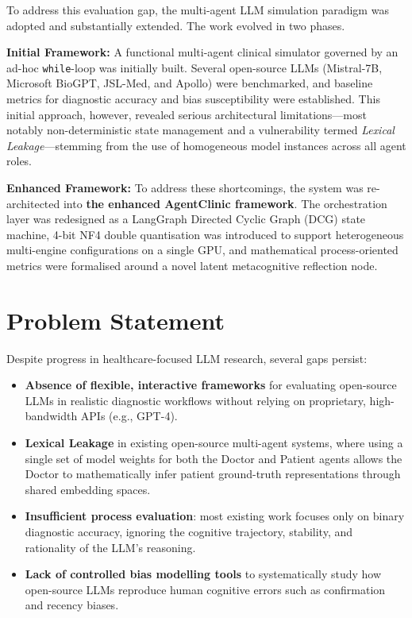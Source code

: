 To address this evaluation gap, the multi-agent LLM simulation paradigm was adopted and substantially extended. The work evolved in two phases.

\textbf{Initial Framework:} A functional multi-agent clinical simulator governed by an ad-hoc \texttt{while}-loop was initially built. Several open-source LLMs (Mistral-7B, Microsoft BioGPT, JSL-Med, and Apollo) were benchmarked, and baseline metrics for diagnostic accuracy and bias susceptibility were established. This initial approach, however, revealed serious architectural limitations---most notably non-deterministic state management and a vulnerability termed \textit{Lexical Leakage}---stemming from the use of homogeneous model instances across all agent roles.

\textbf{Enhanced Framework:} To address these shortcomings, the system was re-architected into \textbf{the enhanced AgentClinic framework}. The orchestration layer was redesigned as a LangGraph Directed Cyclic Graph (DCG) state machine, 4-bit NF4 double quantisation was introduced to support heterogeneous multi-engine configurations on a single GPU, and mathematical process-oriented metrics were formalised around a novel latent metacognitive reflection node.

\section{Problem Statement}

Despite progress in healthcare-focused LLM research, several gaps persist:
\begin{itemize}
    \item \textbf{Absence of flexible, interactive frameworks} for evaluating open-source LLMs in realistic diagnostic workflows without relying on proprietary, high-bandwidth APIs (e.g., GPT-4).
    \item \textbf{Lexical Leakage} in existing open-source multi-agent systems, where using a single set of model weights for both the Doctor and Patient agents allows the Doctor to mathematically infer patient ground-truth representations through shared embedding spaces.
    \item \textbf{Insufficient process evaluation}: most existing work focuses only on binary diagnostic accuracy, ignoring the cognitive trajectory, stability, and rationality of the LLM's reasoning.
    \item \textbf{Lack of controlled bias modelling tools} to systematically study how open-source LLMs reproduce human cognitive errors such as confirmation and recency biases.
\end{itemize}

